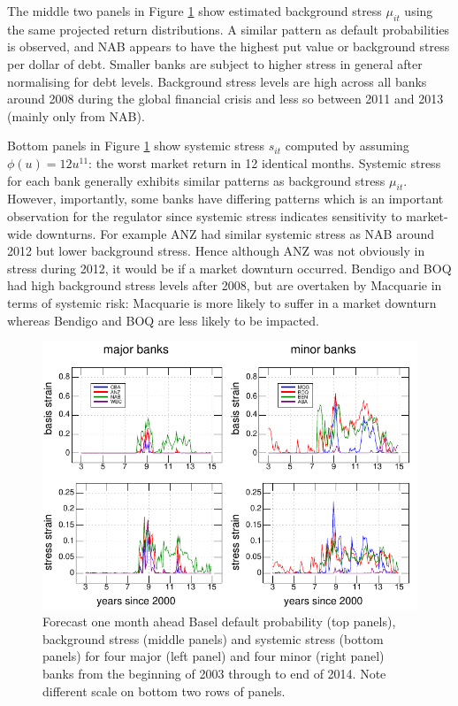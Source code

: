 \documentclass[12pt]{article}
\newcommand{\fref}[1]{Figure \ref{#1}}
\begin{document}
The middle two panels in \fref{default} show estimated background stress $\mu_{it}$ using the same projected return distributions. A similar pattern as default probabilities is observed, and NAB appears to have the highest put value or background stress per dollar of debt. Smaller banks are subject to higher stress in general after normalising for debt levels. Background stress levels are high across all banks around 2008 during the global financial crisis and less so between 2011 and 2013 (mainly only from NAB).


Bottom panels in \fref{default} show systemic stress $s_{it}$ computed by assuming $\phi(u)=12u^{11}$: the worst market return in 12 identical months. Systemic stress for each bank generally exhibits similar patterns as background stress $\mu_{it}$. However, importantly, some banks have differing patterns which is an important observation for the regulator since systemic stress indicates sensitivity to market-wide downturns. For example ANZ had similar systemic stress as NAB around 2012 but lower background stress. Hence although ANZ was not obviously in stress during 2012, it would be if a market downturn occurred. Bendigo and BOQ had high background stress levels after 2008, but are overtaken by Macquarie in terms of systemic risk: Macquarie is more likely to suffer in a market downturn whereas Bendigo and BOQ are less likely to be impacted.



 \begin{figure}[htbp]
\begin{center}
\includegraphics{figures/default.pdf}
\caption{Forecast one month ahead  Basel default probability (top panels), background stress (middle panels) and systemic stress (bottom panels) for  four major (left panel) and four minor (right panel)  banks from the beginning of 2003 through to end of 2014.  Note different scale on bottom two rows of panels.}\label{default}

\end{center}
\end{figure}
\end{document}
